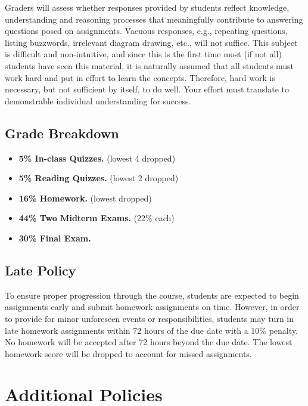 \documentclass[9pt]{article}
\begin{document}
Graders will assess whether responses provided by
students reflect knowledge, understanding and reasoning processes that
{meaningfully contribute} to answering questions posed on assignments.
Vacuous responses, e.g., repeating questions,
listing buzzwords, irrelevant diagram drawing, etc., will not suffice. This subject is difficult and
non-intuitive, and since this is the first time most (if not all)
students have seen this material, it is naturally assumed that all
students must work hard and put in effort to learn the concepts.
Therefore, hard work is necessary, but not sufficient by itself, to do
well. Your effort must translate to demonstrable individual
understanding for success.

\subsection*{Grade Breakdown}

\begin{itemize}[noitemsep]
    \item \textbf{5\% In-class Quizzes.} (lowest 4 dropped)
    \item \textbf{5\% Reading Quizzes.} (lowest 2 dropped)
    \item \textbf{16\% Homework.} (lowest dropped)
    \item \textbf{44\% Two Midterm Exams.} (22\% each)
    \item \textbf{30\% Final Exam.}
\end{itemize}

\subsection*{Late Policy}

To ensure proper progression through the course, students are expected to begin assignments early and submit homework assignments on time. However, in order to provide for minor unforeseen events or responsibilities, students may turn in late homework assignments within 72 hours of the due date with a 10\% penalty. No homework will be accepted after 72 hours beyond the due date. The lowest homework score will be dropped to account for missed assignments.

\section*{Additional Policies}

{\small
    
}
\end{document}
